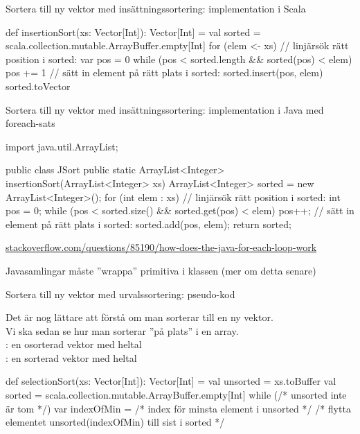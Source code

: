 \begin{Slide}{Sortera till ny vektor med insättningssortering: implementation i Scala}
\begin{Code}
def insertionSort(xs: Vector[Int]): Vector[Int] = {
  val sorted = scala.collection.mutable.ArrayBuffer.empty[Int] 
  for (elem <- xs) {
     // linjärsök rätt position i sorted: 
     var pos = 0
     while (pos < sorted.length && sorted(pos) < elem) {
       pos += 1
     }     
     // sätt in element på rätt plats i sorted:
     sorted.insert(pos, elem) 
  }
  sorted.toVector
}
\end{Code}
\end{Slide}

\begin{Slide}{Sortera till ny vektor med insättningssortering: implementation i Java med foreach-sats}
\SlideFontTiny\vspace{-0.5em}
\begin{Code}[language=Java]
import java.util.ArrayList;

public class JSort {
    public static ArrayList<Integer> insertionSort(ArrayList<Integer> xs) {
        ArrayList<Integer> sorted = new ArrayList<Integer>();
        for (int elem : xs) {
            // linjärsök rätt position i sorted: 
            int pos = 0;  
            while (pos < sorted.size() && sorted.get(pos) < elem) {
                pos++;
            }
            // sätt in element på rätt plats i sorted:
            sorted.add(pos, elem);
        }
        return sorted;
    }
}
\end{Code}
\vspace{-0.3em}
\href{http://stackoverflow.com/questions/85190/how-does-the-java-for-each-loop-work}{ stackoverflow.com/questions/85190/how-does-the-java-for-each-loop-work}

Javasamlingar måste ''wrappa'' primitiva  i klassen  (mer om detta senare)
\end{Slide}

\begin{Slide}{Sortera till ny vektor med urvalssortering: pseudo-kod}

{\SlideFontSmall Det är nog lättare att förstå  om man sorterar till en ny vektor. \\ Vi ska sedan se hur man sorterar ''på plats''  i en  array.\\} \vspace{1em}
: en osorterad vektor med heltal \\
: en sorterad vektor med heltal
\begin{Code}
def selectionSort(xs: Vector[Int]): Vector[Int] = {
  val unsorted = xs.toBuffer
  val sorted = scala.collection.mutable.ArrayBuffer.empty[Int] 
  while (/* unsorted inte är tom */) {
    var indexOfMin = /* index för minsta element i unsorted */
    /* flytta elementet unsorted(indexOfMin) till sist i sorted */ 
  }
}
\end{Code}
\end{Slide}

